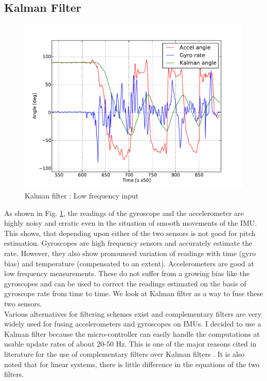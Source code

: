 \subsection{Kalman Filter}
\begin{figure}[!h]
\centering
\includegraphics[scale=0.8]{fig/kalman_lowfreq.pdf}
\caption{Kalman filter : Low frequency input}
\label{fig:5_kalman_lowfreq}
\end{figure}
As shown in Fig. \ref{fig:5_kalman_lowfreq}, the readings of the gyroscope and the accelerometer are highly noisy and erratic even
in the situation of smooth movements of the IMU. This shows, that depending upon either of the two sensors is not good for
pitch estimation. Gyroscopes are high frequency sensors and accurately estimate the rate. However, they also show pronounced
variation of 
readings with time (gyro bias) and temperature (compensated to an extent). Accelerometers are good at low frequency
measurements. These do not suffer from a growing bias like the gyroscopes and can be used to correct the
readings estimated on the basis of gyroscope rate from time to time. We look at Kalman filter as a way to fuse these two sensors.\\

Various alternatives for filtering schemes exist and complementary filters are very widely used for fusing accelerometers and 
gyroscopes on IMUs. I decided to use a Kalman filter because the micro-controller can easily handle the computations
at usable update rates of about 20-50 Hz. This is one of the major reasons cited in literature for the use of complementary
filters over Kalman filters \cite{kalman1975}. It is also noted that for linear systems, there is little difference in the equations
of the two filters.\\

